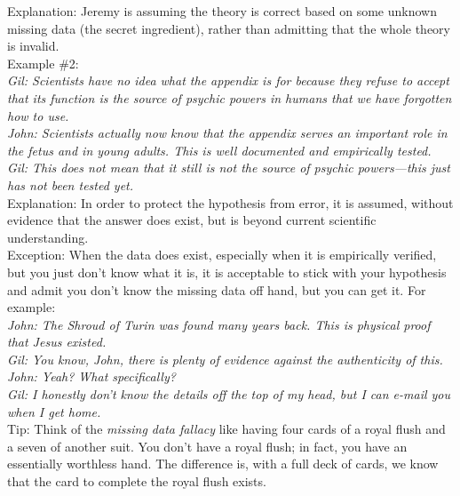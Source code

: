 \documentclass[a4paper,12pt,single,pdftex]{scrartcl}
\begin{document}
    
      Explanation: Jeremy is assuming the theory is correct based on some unknown missing data (the secret ingredient), rather than admitting that the whole theory is invalid.
    \\

    
      Example \#2: 
    \\

    
      {\em Gil: Scientists have no idea what the appendix is for because they refuse to accept that its function is the source of psychic powers in humans that we have forgotten how to use.}
    \\

    
      {\em John: Scientists actually now know that the appendix serves an important role in the fetus and in young adults.  This is well documented and empirically tested.}
    \\

    
      {\em Gil: This does not mean that it still is not the source of psychic powers—this just has not been tested yet.}
    \\

    
      Explanation: In order to protect the hypothesis from error, it is assumed, without evidence that the answer does exist, but is beyond current scientific understanding. 
    \\

    
      Exception: When the data does exist, especially when it is empirically verified, but you just don't know what it is, it is acceptable to stick with your hypothesis and admit you don’t know the missing data off hand, but you can get it.  For example:
    \\

    
      {\em John: The Shroud of Turin was found many years back.  This is physical proof that Jesus existed.}
    \\

    
      {\em Gil: You know, John, there is plenty of evidence against the authenticity of this.}
    \\

    
      {\em John: Yeah? What specifically?}
    \\

    
      {\em Gil: I honestly don’t know the details off the top of my head, but I can e-mail you when I get home.}
    \\

    
      Tip: Think of the {\em missing data fallacy} like having four cards of a royal flush and a seven of another suit. You don’t have a royal flush; in fact, you have an essentially worthless hand. The difference is, with a full deck of cards, we know that the card to complete the royal flush exists.
    \\
\end{document}
